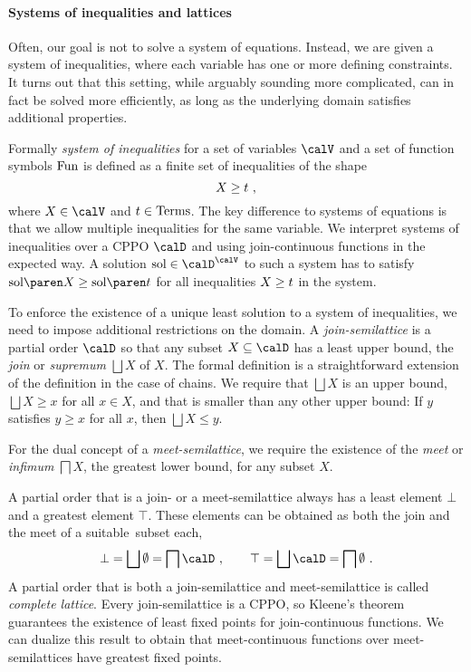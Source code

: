 \documentclass[../../diss.tex]{subfiles}
\begin{document}
\paragraph{Systems of inequalities and lattices}

Often, our goal is not to solve a system of equations.
Instead, we are given a system of inequalities, where each variable has one or more defining constraints.
It turns out that this setting, while arguably sounding more complicated, can in fact be solved more efficiently, as long as the underlying domain satisfies additional properties.

Formally \emph{system of inequalities} for a set of variables $\vars$ and a set of function symbols $\text{Fun}$ is defined as a finite set of inequalities of the shape
\[
    X \geq t
    \ ,
\]
where $X \in \vars$ and $t \in \text{Terms}$.
The key difference to systems of equations is that we allow  multiple inequalities for the same variable.
We interpret systems of inequalities over a CPPO $\domain$ and using join-continuous functions in the expected way.
A solution $\sol \in \domain^\vars$ to such a system has to satisfy $\sol{X} \geq \sol{\term}$ for all inequalities $X \geq t$ in the system.

To enforce the existence of a unique least solution to a system of inequalities, we need to impose additional restrictions on the domain.
A \emph{join-semilattice} is a partial order $\domain$ so that any subset $X \subseteq \domain$ has a least upper  bound, the \emph{join} or \emph{supremum} $\bigsqcup X$ of $X$.
The formal definition is a straightforward extension of the definition in the case of chains.
We require that $\bigsqcup X$ is an upper bound, \ie $\bigsqcup X \geq x$ for all $x \in X$, and that is smaller than any other upper bound:
If $y$ satisfies $y \geq x$ for all $x$, then $\bigsqcup X \leq y$.

For the dual concept of a \emph{meet-semilattice}, we require the existence of the \emph{meet} or \emph{infimum} $\bigsqcap X$, the greatest lower bound, for any subset $X$.

A partial order that is a join- or a meet-semilattice always has a least element $\bot$ and a greatest element $\top$.
These elements can be obtained as both the join and the meet of a suitable~subset each,
\[
    \bot = \bigsqcup \emptyset = \bigsqcap \domain
    \ ,
    \qquad
    \top = \bigsqcup \domain = \bigsqcap \emptyset
    \ .
\]
A partial order that is both a join-semilattice and meet-semilattice is called \emph{complete lattice}.
Every join-semilattice is a CPPO, so Kleene's theorem guarantees the existence of least fixed points for join-continuous functions.
We can dualize this result to obtain that meet-continuous functions over meet-semilattices have greatest fixed points.
\end{document}
